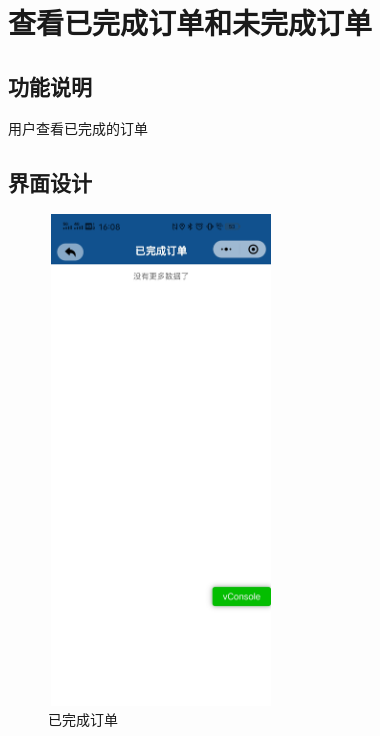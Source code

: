 \newpage


\section{查看已完成订单和未完成订单}
\subsection{功能说明}
用户查看已完成的订单
\subsection{界面设计}
\begin{figure}[htbp]
    \centering
    \begin{minipage}[t]{0.48\textwidth}
    \centering
    \includegraphics[width=6cm,height=13cm]{design/image/ui8.png} 
    \caption{已完成订单}
    \end{minipage}
    \begin{minipage}[t]{0.48\textwidth}
    \centering

\end{minipage}
\end{figure}
